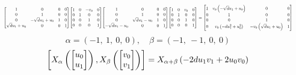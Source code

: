 \documentclass[11pt]{article}
\theoremstyle{definition}
\begin{document}
\[
\scaletoalign{\textwidth}{{\left[\begin{matrix}1 & 0 & 0 & 0\\0 & 1 & 0 & 0\\0 & - \sqrt{d} u_{1} + u_{0} & 1 & 0\\\sqrt{d} u_{1} + u_{0} & 0 & 0 & 1\end{matrix}\right]} {\left[\begin{matrix}1 & 0 & - v_{0} & 0\\0 & 1 & 0 & 0\\0 & 0 & 1 & 0\\0 & 0 & 0 & 1\end{matrix}\right]} {\left[\begin{matrix}1 & 0 & 0 & 0\\0 & 1 & 0 & 0\\0 & \sqrt{d} u_{1} - u_{0} & 1 & 0\\- \sqrt{d} u_{1} - u_{0} & 0 & 0 & 1\end{matrix}\right]} {\left[\begin{matrix}1 & 0 & v_{0} & 0\\0 & 1 & 0 & 0\\0 & 0 & 1 & 0\\0 & 0 & 0 & 1\end{matrix}\right]} = {\left[\begin{matrix}1 & v_{0} \left(- \sqrt{d} u_{1} + u_{0}\right) & 0 & 0\\0 & 1 & 0 & 0\\0 & 0 & 1 & 0\\0 & v_{0} \left(- d u_{1}^{2} + u_{0}^{2}\right) & - v_{0} \left(\sqrt{d} u_{1} + u_{0}\right) & 1\end{matrix}\right]}}
\]
\[
\alpha = \left( -1, \  1, \  0, \  0\right), \quad \beta = \left( -1, \  -1, \  0, \  0\right)
\]
\[
\scaletoalign{\textwidth}{\left[ X_{\alpha}\left(\left[\begin{matrix}u_{0}\\u_{1}\end{matrix}\right]\right), X_{\beta}\left(\left[\begin{matrix}v_{0}\\v_{1}\end{matrix}\right]\right) \right] = X_{\alpha + \beta}\left(- 2 d u_{1} v_{1} + 2 u_{0} v_{0}\right)}
\]
\end{document}

